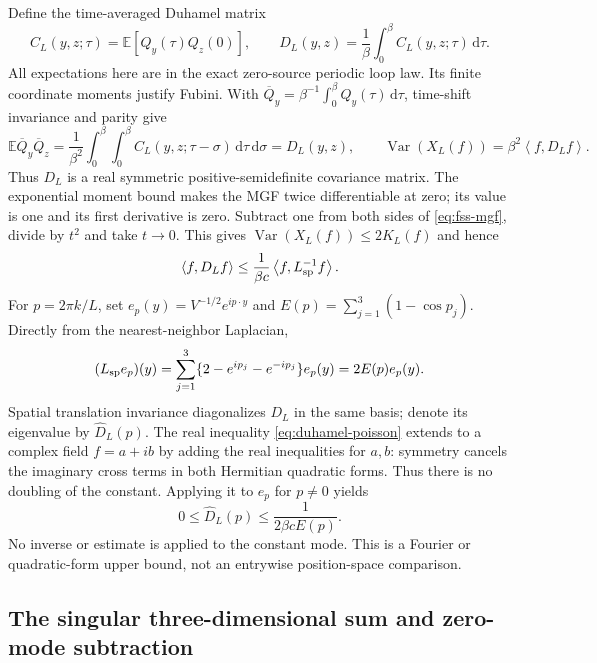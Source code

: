 \documentclass[11pt]{article}
\numberwithin{equation}{section}
\theoremstyle{definition}
\newcommand{\E}{\mathbb E}
\newcommand{\dd}{\,\mathrm d}
\newcommand{\ip}[2]{\left\langle#1,#2\right\rangle}
\newcommand{\Var}{\operatorname{Var}}
\begin{document}
Define the time-averaged Duhamel matrix
\begin{equation}
 C_L(y,z;\tau)=\E[Q_y(\tau)Q_z(0)],\qquad
 D_L(y,z)=\frac1\beta\int_0^\beta C_L(y,z;\tau)\dd\tau. \label{eq:duhamel-matrix}
\end{equation}
All expectations here are in the exact zero-source periodic loop law.
Its finite coordinate moments justify Fubini.  With
$\overline Q_y=\beta^{-1}\int_0^\beta Q_y(\tau)\dd\tau$, time-shift
invariance and parity give
\begin{equation}
 \E\overline Q_y\overline Q_z
 =\frac1{\beta^2}\int_0^\beta\int_0^\beta
      C_L(y,z;\tau-\sigma)\dd\tau\dd\sigma
 =D_L(y,z),\qquad
 \Var(X_L(f))=\beta^2\ip f{D_Lf}.
 \label{eq:duhamel-two-time}
\end{equation}
Thus $D_L$ is a real symmetric positive-semidefinite covariance matrix.
The exponential moment bound makes the MGF twice differentiable at zero;
its value is one and its first derivative is zero.  Subtract one from both
sides of \eqref{eq:fss-mgf}, divide by $t^2$ and take $t\to0$.  This
gives $\Var(X_L(f))\leq2K_L(f)$ and hence
\begin{equation}
 \ip{f}{D_Lf}\leq\frac1{\beta c}\ip{f}{L_{\rm sp}^{-1}f}. \label{eq:duhamel-poisson}
\end{equation}
For $p=2\pi k/L$, set $e_p(y)=V^{-1/2}e^{ip\cdot y}$ and
$E(p)=\sum_{j=1}^3(1-\cos p_j)$.  Directly from the nearest-neighbor
Laplacian,
\[
 (L_{\rm sp}e_p)(y)
 =\sum_{j=1}^3\{2-e^{ip_j}-e^{-ip_j}\}e_p(y)=2E(p)e_p(y).
\]
Spatial translation invariance diagonalizes $D_L$ in the same basis; denote
its eigenvalue by $\widehat D_L(p)$.  The real inequality
\eqref{eq:duhamel-poisson} extends to a complex field $f=a+ib$ by adding
the real inequalities for $a,b$: symmetry cancels the imaginary cross terms
in both Hermitian quadratic forms.  Thus there is no doubling of the
constant.  Applying it to $e_p$ for $p\neq0$ yields
\begin{equation}
 0\leq\widehat D_L(p)\leq\frac1{2\beta cE(p)}. \label{eq:infrared-bound}
\end{equation}
No inverse or estimate is applied to the constant mode.  This is a Fourier
or quadratic-form upper bound, not an entrywise position-space comparison.

\subsection{The singular three-dimensional sum and zero-mode subtraction}
\label{sec:infrared-singular-sum}
\end{document}
